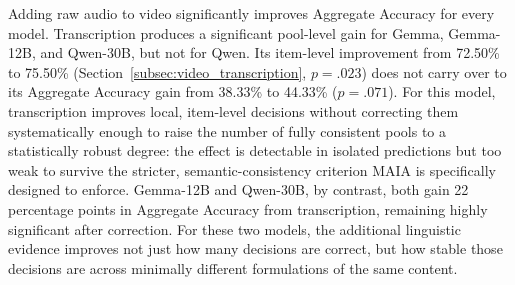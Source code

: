 Adding raw audio to video significantly improves Aggregate Accuracy for every model. Transcription produces a significant pool-level gain for Gemma, Gemma-12B, and Qwen-30B, but not for Qwen. Its item-level improvement from 72.50\% to 75.50\% (Section~\ref{subsec:video_transcription}, $p=.023$) does not carry over to its Aggregate Accuracy gain from 38.33\% to 44.33\% ($p=.071$). For this model, transcription improves local, item-level decisions without correcting them systematically enough to raise the number of fully consistent pools to a statistically robust degree: the effect is detectable in isolated predictions but too weak to survive the stricter, semantic-consistency criterion MAIA is specifically designed to enforce. Gemma-12B and Qwen-30B, by contrast, both gain 22 percentage points in Aggregate Accuracy from transcription, remaining highly significant after correction. For these two models, the additional linguistic evidence improves not just how many decisions are correct, but how stable those decisions are across minimally different formulations of the same content.
